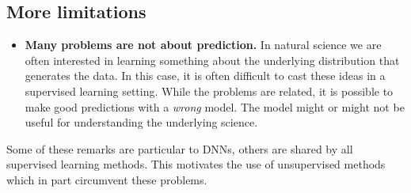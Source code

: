 \documentclass[%
oneside,                 %
final,                   %
10pt]{article}
\begin{document}
\noindent
\subsection{More limitations}

\begin{itemize}
\item \textbf{Many problems are not about prediction.} In natural science we are often interested in learning something about the underlying distribution that generates the data. In this case, it is often difficult to cast these ideas in a supervised learning setting. While the problems are related, it is possible to make good predictions with a \emph{wrong} model. The model might or might not be useful for understanding the underlying science.
\end{itemize}

\noindent
Some of these remarks are particular to DNNs, others are shared by all supervised learning methods. This motivates the use of unsupervised methods which in part circumvent these problems.



\end{document}
